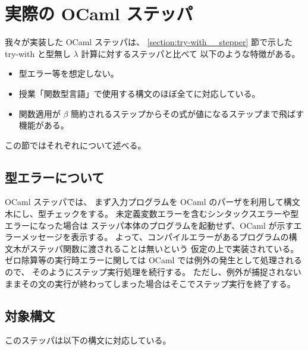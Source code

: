 \section{実際の OCaml ステッパ}
\label{section:ocaml stepper}

我々が実装した OCaml ステッパは、
\ref{section:try-with__stepper} 節で示した try-with と型無し $\lambda$ 計算に対するステッパと比べて
以下のような特徴がある。

\begin{itemize}
\item 型エラー等を想定しない。
\item 授業「関数型言語」で使用する構文のほぼ全てに対応している。
\item 関数適用が $\beta$ 簡約されるステップからその式が値になるステップまで飛ばす機能がある。
\end{itemize}

この節ではそれぞれについて述べる。

\subsection{型エラーについて}
\label{subsection:stepper__type}

OCaml ステッパでは、
まず入力プログラムを OCaml のパーザを利用して構文木にし、型チェックをする。
未定義変数エラーを含むシンタックスエラーや型エラーになった場合は
ステッパ本体のプログラムを起動せず、OCaml が示すエラーメッセージを表示する。
よって、コンパイルエラーがあるプログラムの構文木がステッパ関数に渡されることは無いという
仮定の上で実装されている。
ゼロ除算等の実行時エラーに関しては OCaml では例外の発生として処理されるので、
そのようにステップ実行処理を続行する。
ただし、例外が捕捉されないままその文の実行が終わってしまった場合はそこでステップ実行を終了する。

\subsection{対象構文}
\label{subsection:stepper__syntax}
このステッパは以下の構文に対応している。

